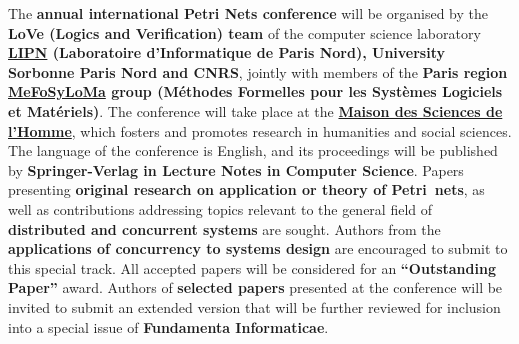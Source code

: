 \documentclass[10pt,a4paper]{article}
\begin{document}
\bigskip

The {\bf{} annual international Petri Nets conference} will be organised by
the {\bf LoVe (Logics and Verification) team} of the computer science laboratory 
{\bf \href{https://lipn.univ-paris13.fr/}{LIPN} (Laboratoire d'Informatique de Paris
Nord), University Sorbonne Paris Nord and CNRS},
jointly with members of the {\bf Paris region \href{http://mefosyloma.fr/}{MeFoSyLoMa} group (Méthodes Formelles
pour les Systèmes Logiciels et Matériels)}.
%
The conference will take place at the
\href{https://www.mshparisnord.fr}{\bf Maison des Sciences de l'Homme},
which fosters and promotes research in humanities and social sciences.
%
The language of the conference is English, and its proceedings will be published by
{\bf Springer-Verlag in Lecture Notes in Computer Science}.
Papers presenting {\bf original research on application or theory of Petri nets}, as well
as contributions addressing topics relevant to the general field of {\bf distributed and
concurrent systems} are sought. Authors from the {\bf applications of concurrency
to systems
design} are encouraged to submit to this special track. All accepted papers will be considered for an {\bf ``Outstanding
Paper''} award. Authors of {\bf selected papers} presented at the conference will be invited
to submit an extended version that will be further reviewed for inclusion into a special
issue of {\bf Fundamenta Informaticae}.
\end{document}

